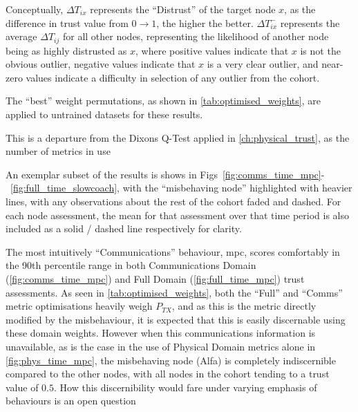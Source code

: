 Conceptually, $\Delta T_{ix}$ represents the ``Distrust'' of the target node $x$, as the difference in trust value from $0\to1$, the higher the better. 
$\Delta T_{ix}^-$ represents the average $\Delta T_{ij}$ for all other nodes, representing the likelihood of another node being as highly distrusted as $x$, where positive values indicate that $x$ is not the obvious outlier, negative values indicate that $x$ is a very clear outlier, and near-zero values indicate a difficulty in selection of any outlier from the cohort.

The ``best'' weight permutations, as shown in \autoref{tab:optimised_weights}, are applied to untrained datasets for these results.

This is a departure from the Dixons Q-Test applied in \autoref{ch:physical_trust}, as the number of metrics in use 

An exemplar subset of the results is shows in Figs~\ref{fig:comms_time_mpc}-~\ref{fig:full_time_slowcoach}, with the ``misbehaving node'' highlighted with heavier lines, with any observations about the rest of the cohort faded and dashed. For each node assessment, the mean for that assessment over that time period is also included as a solid / dashed line respectively for clarity.

The most intuitively ``Communications'' behaviour, \gls{mpc}, scores comfortably in the 90th percentile range in both Communications Domain (\autoref{fig:comms_time_mpc}) and Full Domain (\autoref{fig:full_time_mpc})  trust assessments. As seen in \autoref{tab:optimised_weights}, both the ``Full'' and ``Comms'' metric optimisations heavily weigh $P_{TX}$, and as this is the metric directly modified by the misbehaviour, it is expected that this is easily discernable using these domain weights.
However when this communications information is unavailable, as is the case in the use of Physical Domain metrics alone in \autoref{fig:phys_time_mpc}, the misbehaving node (Alfa) is completely indiscernible compared to the other nodes, with all nodes in the cohort tending to a trust value of $0.5$.
How this discernibility would fare under varying emphasis of behaviours is an open question

